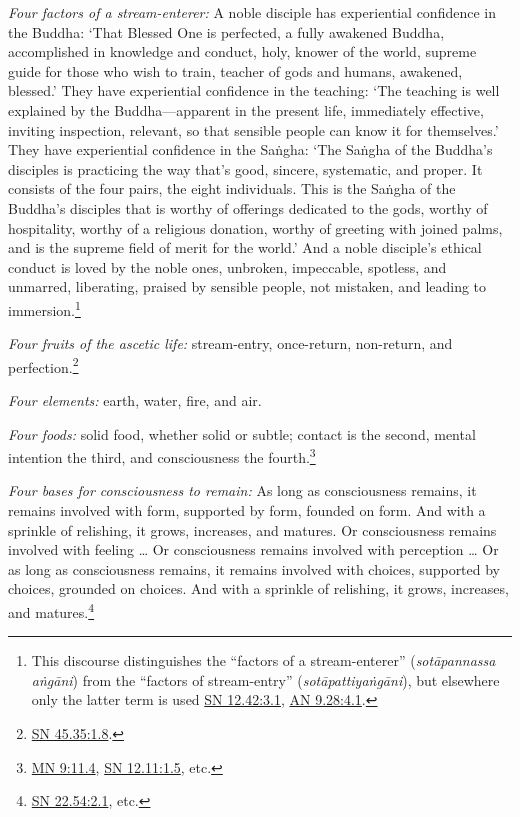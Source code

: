 \documentclass[12pt,openany]{book}%
\begin{document}
\emph{Four factors of a stream-enterer:} A noble disciple has experiential confidence in the Buddha: ‘That Blessed One is perfected, a fully awakened Buddha, accomplished in knowledge and conduct, holy, knower of the world, supreme guide for those who wish to train, teacher of gods and humans, awakened, blessed.’ They have experiential confidence in the teaching: ‘The teaching is well explained by the Buddha—apparent in the present life, immediately effective, inviting inspection, relevant, so that sensible people can know it for themselves.’ They have experiential confidence in the \textsanskrit{Saṅgha}: ‘The \textsanskrit{Saṅgha} of the Buddha’s disciples is practicing the way that’s good, sincere, systematic, and proper. It consists of the four pairs, the eight individuals. This is the \textsanskrit{Saṅgha} of the Buddha’s disciples that is worthy of offerings dedicated to the gods, worthy of hospitality, worthy of a religious donation, worthy of greeting with joined palms, and is the supreme field of merit for the world.’ And a noble disciple’s ethical conduct is loved by the noble ones, unbroken, impeccable, spotless, and unmarred, liberating, praised by sensible people, not mistaken, and leading to immersion.\footnote{This discourse distinguishes the “factors of a stream-enterer” (\textit{\textsanskrit{sotāpannassa} \textsanskrit{aṅgāni}}) from the “factors of stream-entry” (\textit{\textsanskrit{sotāpattiyaṅgāni}}), but elsewhere only the latter term is used \href{https://suttacentral.net/sn12.42/en/sujato\#3.1}{SN 12.42:3.1}, \href{https://suttacentral.net/an9.28/en/sujato\#4.1}{AN 9.28:4.1}. } 

\emph{Four fruits of the ascetic life:} stream-entry, once-return, non-return, and perfection.\footnote{\href{https://suttacentral.net/sn45.35/en/sujato\#1.8}{SN 45.35:1.8}. } 

\emph{Four elements:} earth, water, fire, and air. 

\emph{Four foods:} solid food, whether solid or subtle; contact is the second, mental intention the third, and consciousness the fourth.\footnote{\href{https://suttacentral.net/mn9/en/sujato\#11.4}{MN 9:11.4}, \href{https://suttacentral.net/sn12.11/en/sujato\#1.5}{SN 12.11:1.5}, etc. } 

\emph{Four bases for consciousness to remain:} As long as consciousness remains, it remains involved with form, supported by form, founded on form. And with a sprinkle of relishing, it grows, increases, and matures. Or consciousness remains involved with feeling … Or consciousness remains involved with perception … Or as long as consciousness remains, it remains involved with choices, supported by choices, grounded on choices. And with a sprinkle of relishing, it grows, increases, and matures.\footnote{\href{https://suttacentral.net/sn22.54/en/sujato\#2.1}{SN 22.54:2.1}, etc. } 
\end{document}
